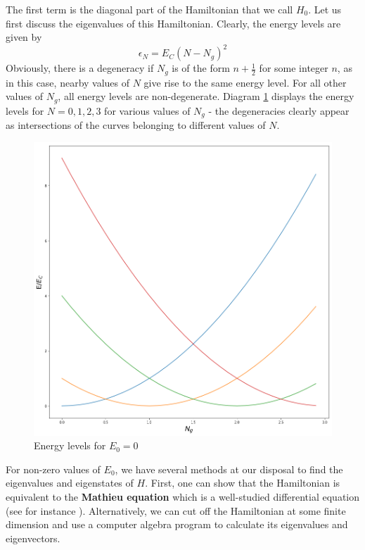 \documentclass[a4paper, draft]{article}
\theoremstyle{own}
\theoremstyle{remark}
\begin{document}
The first term is the diagonal part of the Hamiltonian that we call $H_0$. Let us first discuss the eigenvalues of this Hamiltonian. Clearly, the energy levels are given by
$$
\epsilon_N = E_C (N - N_g)^2 
$$
Obviously, there is a degeneracy if $N_g$ is of the form $n + \frac{1}{2}$ for some integer $n$, as in this case, nearby values of $N$ give rise to the same energy level. For all other values of $N_g$, all energy levels are non-degenerate. Diagram \ref{fig:CooperPairBoxEnergyLevels_unperturbed} displays the energy levels for $N=0,1,2,3$ for various values of $N_g$ - the degeneracies clearly appear as intersections of the curves belonging to different values of $N$.

\begin{figure}[ht]
\centering
\includegraphics[width=0.7\linewidth]{images/CooperPairBoxEnergyLevels_unperturbed}
\caption[Energy levels for $E_0=0$]{Energy levels for $E_0=0$}
\label{fig:CooperPairBoxEnergyLevels_unperturbed}
\end{figure}

For non-zero values of $E_0$, we have several methods at our disposal to find the eigenvalues and eigenstates of $H$. First, one can show that the Hamiltonian is equivalent to the {\bf Mathieu equation} which is a well-studied differential equation (see for instance \cite{DevoretWallraffMartinis}). Alternatively, we can cut off the Hamiltonian at some finite dimension and use a computer algebra program to calculate its eigenvalues and eigenvectors. 
\end{document}
